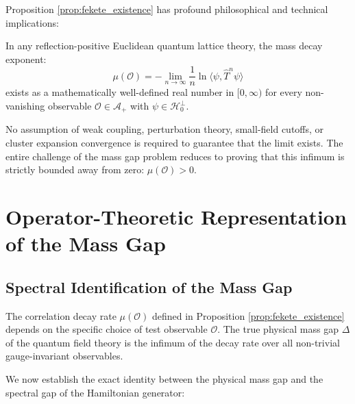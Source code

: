 Proposition \ref{prop:fekete_existence} has profound philosophical and technical implications:
\begin{corollary}
\label{cor:unconditional_mass_rate}
In any reflection-positive Euclidean quantum lattice theory, the mass decay exponent:
\begin{equation}
\mu(\mathcal{O}) = -\lim_{n \to \infty} \frac{1}{n} \ln \langle \psi, \hat{T}^n \psi \rangle
\end{equation}
exists as a mathematically well-defined real number in $[0, \infty)$ for every non-vanishing observable $\mathcal{O} \in \mathcal{A}_+$ with $\psi \in \mathcal{H}_0^\perp$.

No assumption of weak coupling, perturbation theory, small-field cutoffs, or cluster expansion convergence is required to guarantee that the limit exists. The entire challenge of the mass gap problem reduces to proving that this infimum is strictly bounded away from zero: $\mu(\mathcal{O}) > 0$.
\end{corollary}

\section{Operator-Theoretic Representation of the Mass Gap}
\label{sec:operator_spectral_gap}

\subsection{Spectral Identification of the Mass Gap}
\label{subsec:spectral_identification_theorem}

The correlation decay rate $\mu(\mathcal{O})$ defined in Proposition \ref{prop:fekete_existence} depends on the specific choice of test observable $\mathcal{O}$. The true physical mass gap $\Delta$ of the quantum field theory is the infimum of the decay rate over all non-trivial gauge-invariant observables.

We now establish the exact identity between the physical mass gap and the spectral gap of the Hamiltonian generator:

